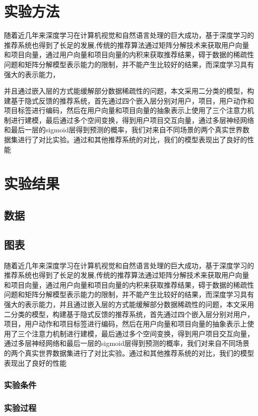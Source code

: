 \documentclass{article}%
\begin{document}
    \section{实验方法}
    随着近几年来深度学习在计算机视觉和自然语言处理的巨大成功，基于深度学习的推荐系统也得到了长足的发展,传统的推荐算法通过矩阵分解技术来获取用户向量和项目向量，通过用户向量和项目向量的内积来获取推荐结果，碍于数据的稀疏性问题和矩阵分解模型表示能力的限制，并不能产生比较好的结果，而深度学习具有强大的表示能力，\par 并且通过嵌入层的方式能缓解部分数据稀疏性的问题，本文采用二分类的模型，构建基于隐式反馈的推荐系统，首先通过四个嵌入层分别对用户，项目，用户动作和项目标签进行编码，然后在用户向量和项目向量的抽象表示上使用了三个注意力机制进行建模，最后通过多个空间变换，得到用户项目交互向量，通过多层神经网络和最后一层的sigmoid层得到预测的概率，我们对来自不同场景的两个真实世界数据集进行了对比实验。通过和其他推荐系统的对比，我们的模型表现出了良好的性能
    \section{实验结果}
    \subsection{数据}
    \subsection{图表}
    随着近几年来深度学习在计算机视觉和自然语言处理的巨大成功，基于深度学习的推荐系统也得到了长足的发展,传统的推荐算法通过矩阵分解技术来获取用户向量和项目向量，通过用户向量和项目向量的内积来获取推荐结果，碍于数据的稀疏性问题和矩阵分解模型表示能力的限制，并不能产生比较好的结果，而深度学习具有强大的表示能力，并且通过嵌入层的方式能缓解部分数据稀疏性的问题，本文采用二分类的模型，构建基于隐式反馈的推荐系统，首先通过四个嵌入层分别对用户，项目，用户动作和项目标签进行编码，然后在用户向量和项目向量的抽象表示上使用了三个注意力机制进行建模，最后通过多个空间变换，得到用户项目交互向量，通过多层神经网络和最后一层的sigmoid层得到预测的概率，我们对来自不同场景的两个真实世界数据集进行了对比实验。通过和其他推荐系统的对比，我们的模型表现出了良好的性能
    \subsubsection{实验条件}
    \subsubsection{实验过程}
\end{document}
